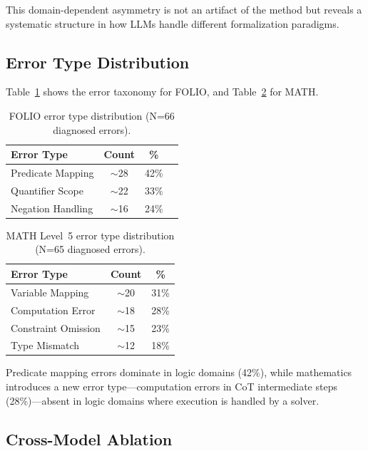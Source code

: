 \documentclass[11pt,a4paper]{article}
\begin{document}
This domain-dependent asymmetry is not an artifact of the method but reveals a systematic structure in how LLMs handle different formalization paradigms.

\subsection{Error Type Distribution}
\label{sec:error-types}

Table~\ref{tab:folio-errors} shows the error taxonomy for FOLIO, and Table~\ref{tab:math-errors} for MATH.

\begin{table}[t]
\centering
\small
\caption{FOLIO error type distribution (N=66 diagnosed errors).}
\label{tab:folio-errors}
\begin{tabular}{@{}lccl@{}}
\toprule
\textbf{Error Type} & \textbf{Count} & \textbf{\%} \\
\midrule
Predicate Mapping & $\sim$28 & 42\% \\
Quantifier Scope & $\sim$22 & 33\% \\
Negation Handling & $\sim$16 & 24\% \\
\bottomrule
\end{tabular}
\end{table}

\begin{table}[t]
\centering
\small
\caption{MATH Level~5 error type distribution (N=65 diagnosed errors).}
\label{tab:math-errors}
\begin{tabular}{@{}lcc@{}}
\toprule
\textbf{Error Type} & \textbf{Count} & \textbf{\%} \\
\midrule
Variable Mapping & $\sim$20 & 31\% \\
Computation Error & $\sim$18 & 28\% \\
Constraint Omission & $\sim$15 & 23\% \\
Type Mismatch & $\sim$12 & 18\% \\
\bottomrule
\end{tabular}
\end{table}

Predicate mapping errors dominate in logic domains (42\%), while mathematics introduces a new error type---computation errors in CoT intermediate steps (28\%)---absent in logic domains where execution is handled by a solver.

\subsection{Cross-Model Ablation}
\label{sec:cross-model}
\end{document}
